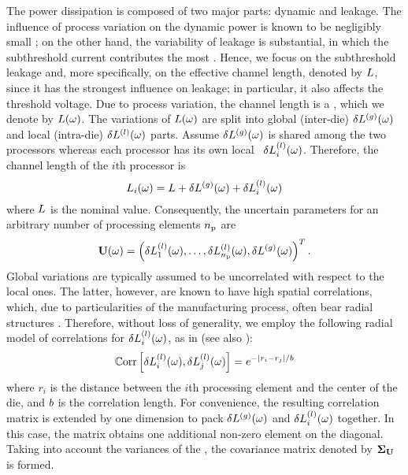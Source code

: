 The power dissipation is composed of two major parts: dynamic and leakage.
The influence of process variation on the dynamic power is known to be negligibly small \cite{srivastava2010, juan2011, juan2012}; on the other hand, the variability of leakage is substantial, in which the subthreshold current contributes the most \cite{juan2011, juan2012}.
Hence, we focus on the subthreshold leakage and, more specifically, on the effective channel length, denoted by $L$, since it has the strongest influence on leakage; in particular, it also affects the threshold voltage.
Due to process variation, the channel length is a \rv, which we denote by $L(\omega)$. The variations of $L(\omega)$ are split into global (inter-die) ${\delta L^{(g)}}(\omega)$ and local (intra-die) $\delta L^{(l)}(\omega)$ parts. Assume ${\delta L^{(g)}}(\omega)$ is shared among the two processors whereas each processor has its own local \rv\ $\delta L^{(l)}_i(\omega)$. Therefore, the channel length of the $i$th processor is
\begin{equation} \elabel{leakage-partition}
  \Leff_i(\o) = \nLeff + \gLeff(\o) + \lLeff_i(\o)
\end{equation}
where $L$ is the nominal value. Consequently, the uncertain parameters for an arbitrary number of processing elements ${n_\text{p}}$ are
\[
  \mathbf{U}(\omega) = \left(\delta L^{(l)}_1(\omega), \dotsc, \delta L^{(l)}_{n_\text{p}}(\omega), {\delta L^{(g)}}(\omega) \right)^T.
\]
Global variations are typically assumed to be uncorrelated with respect to the local ones.
The latter, however, are known to have high spatial correlations, which, due to particularities of the manufacturing process, often bear radial structures \cite{friedberg2005, cheng2011}.
Therefore, without loss of generality, we employ the following radial model of correlations for $\delta L^{(l)}_i(\omega)$, as in \cite{ghanta2006} (see also \cite{ghanem1991}):
\begin{equation} \elabel{covariance-function}
  \oCorr{\lLeff_i(\o), \lLeff_j(\o)} = e^{-|r_i - r_j|/\corrLength}
\end{equation}
where $r_i$ is the distance between the $i$th processing element and the center of the die, and $b$ is the correlation length.
For convenience, the resulting correlation matrix is extended by one dimension to pack ${\delta L^{(g)}}(\omega)$ and $\delta L^{(l)}_i(\omega)$ together.
In this case, the matrix obtains one additional non-zero element on the diagonal. Taking into account the variances of the \rvs, the covariance matrix denoted by $\mCov_\vU$ is formed.
